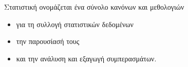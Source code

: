Στατιστική ονομάζεται ένα σύνολο κανόνων και μεθολογιών
\begin{itemize}
\item για τη συλλογή στατιστικών δεδομένων
\item την παρουσίασή τους
\item και την ανάλυση και εξαγωγή συμπερασμάτων.
\end{itemize}
